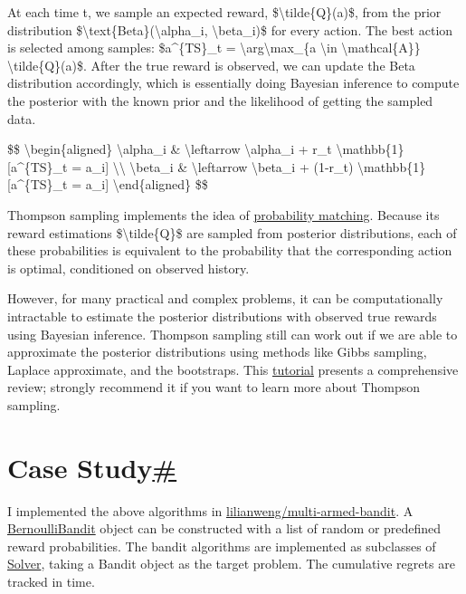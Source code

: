 At each time t, we sample an expected reward, \$\textbackslash tilde\{Q\}(a)\$, from the prior distribution \$\textbackslash text\{Beta\}(\textbackslash alpha\_i, \textbackslash beta\_i)\$ for every action. The best action is selected among samples: \$a\^{}\{TS\}\_t = \textbackslash arg\textbackslash max\_\{a \textbackslash in \textbackslash mathcal\{A\}\} \textbackslash tilde\{Q\}(a)\$. After the true reward is observed, we can update the Beta distribution accordingly, which is essentially doing Bayesian inference to compute the posterior with the known prior and the likelihood of getting the sampled data.

\$\$ \textbackslash begin\{aligned\} \textbackslash alpha\_i \& \textbackslash leftarrow \textbackslash alpha\_i + r\_t \textbackslash mathbb\{1\}{[}a\^{}\{TS\}\_t = a\_i{]} \textbackslash\textbackslash{} \textbackslash beta\_i \& \textbackslash leftarrow \textbackslash beta\_i + (1-r\_t) \textbackslash mathbb\{1\}{[}a\^{}\{TS\}\_t = a\_i{]} \textbackslash end\{aligned\} \$\$

Thompson sampling implements the idea of \href{https://en.wikipedia.org/wiki/Probability_matching}{probability matching}. Because its reward estimations \$\textbackslash tilde\{Q\}\$ are sampled from posterior distributions, each of these probabilities is equivalent to the probability that the corresponding action is optimal, conditioned on observed history.

However, for many practical and complex problems, it can be computationally intractable to estimate the posterior distributions with observed true rewards using Bayesian inference. Thompson sampling still can work out if we are able to approximate the posterior distributions using methods like Gibbs sampling, Laplace approximate, and the bootstraps. This \href{https://arxiv.org/pdf/1707.02038.pdf}{tutorial} presents a comprehensive review; strongly recommend it if you want to learn more about Thompson sampling.

\section{\texorpdfstring{Case Study\hyperref[case-study]{\#}}{Case Study\#}}\label{case-study}

I implemented the above algorithms in \href{https://github.com/lilianweng/multi-armed-bandit}{lilianweng/multi-armed-bandit}. A \href{https://github.com/lilianweng/multi-armed-bandit/blob/master/bandits.py\#L13}{BernoulliBandit} object can be constructed with a list of random or predefined reward probabilities. The bandit algorithms are implemented as subclasses of \href{https://github.com/lilianweng/multi-armed-bandit/blob/master/solvers.py\#L9}{Solver}, taking a Bandit object as the target problem. The cumulative regrets are tracked in time.

